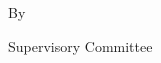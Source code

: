\newpage
{}

{
\centering
\thesistitle
\tpbreak
By
\tpbreak
\nameanddegrees
\tpbreak
}

\newcommand\panelist[3]{\noindent #1, #2\\\noindent(#3)\tpbreak}
\vfill
\noindent Supervisory Committee
\tpbreak
\panel
\vfill
\pagebreak
